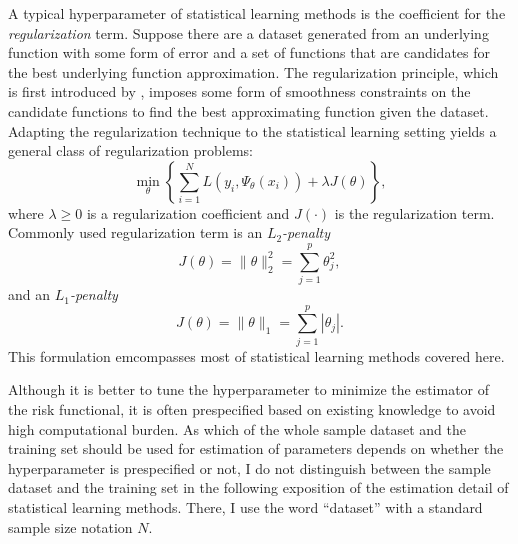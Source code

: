 \documentclass[12pt]{article}
\begin{document}
A typical hyperparameter of statistical learning methods is the coefficient for the {\it regularization} term. Suppose there are a dataset generated from an underlying function with some form of error and a set of functions that are candidates for the best underlying function approximation. The regularization principle, which is first introduced by \textcite{Tikhonov1963}, imposes some form of smoothness constraints on the candidate functions to find the best approximating function given the dataset. Adapting the regularization technique to the statistical learning setting yields a general class of regularization problems:
\begin{equation}
\label{eq:grp}
\min_{\theta} \left\{\sum_{i=1}^N L(y_i, \Psi_{\theta}(x_i)) + \lambda J(\theta) \right\},
\end{equation}
where $\lambda \geq 0$ is a regularization coefficient and $J(\cdot)$ is the regularization term. Commonly used regularization term is an {\it $L_2$-penalty}
\begin{equation*}
J(\theta) = \|\theta\|_2^2 = \sum_{j=1}^p \theta_j^2,
\end{equation*}
and an {\it $L_1$-penalty}
\begin{equation*}
J(\theta) = \|\theta\|_1 = \sum_{j=1}^p |\theta_j|.
\end{equation*}
This formulation emcompasses most of statistical learning methods covered here.

Although it is better to tune the hyperparameter to minimize the estimator of the risk functional, it is often prespecified based on existing knowledge to avoid high computational burden. As which of the whole sample dataset and the training set should be used for estimation of parameters depends on whether the hyperparameter is prespecified or not, I do not distinguish between the sample dataset and the training set in the following exposition of the estimation detail of statistical learning methods. There, I use the word ``dataset'' with a standard sample size notation $N$.
\end{document}
